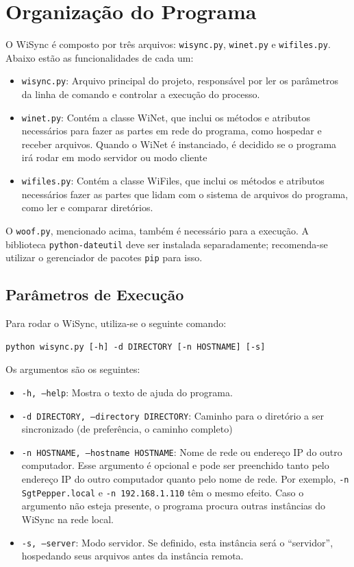 \documentclass[12pt,a4paper]{ufpr}
\begin{document}
\section{Organização do Programa}
O WiSync é composto por três arquivos: \texttt{wisync.py}, \texttt{winet.py} e \texttt{wifiles.py}. Abaixo estão as funcionalidades de cada um:
\begin{itemize}
  \item \texttt{wisync.py}: Arquivo principal do projeto, responsável por ler os parâmetros da linha de comando e controlar a execução do processo.
  \item \texttt{winet.py}: Contém a classe WiNet, que inclui os métodos e atributos necessários para fazer as partes em rede do programa, como hospedar e receber arquivos.
  Quando o WiNet é instanciado, é decidido se o programa irá rodar em modo servidor ou modo cliente
  \item \texttt{wifiles.py}: Contém a classe WiFiles, que inclui os métodos e atributos necessários fazer as partes que lidam com o sistema de arquivos do programa, como ler e comparar diretórios.
\end{itemize}
O \texttt{woof.py}, mencionado acima, também é necessário para a execução.
A biblioteca \texttt{python-dateutil} \cite{python-dateutil} deve ser instalada separadamente; recomenda-se utilizar o gerenciador de pacotes \texttt{pip} \cite{pip} para isso.

\subsection{Parâmetros de Execução}

Para rodar o WiSync, utiliza-se o seguinte comando:
\begin{verbatim}
python wisync.py [-h] -d DIRECTORY [-n HOSTNAME] [-s]
\end{verbatim}

Os argumentos são os seguintes:
\begin{itemize}
  \item \texttt{-h, --help}: Mostra o texto de ajuda do programa.
  \item \texttt{-d DIRECTORY, --directory DIRECTORY}: Caminho para o diretório a ser sincronizado (de preferência, o caminho completo)
  \item \texttt{-n HOSTNAME, --hostname HOSTNAME}: Nome de rede ou endereço IP do outro computador. Esse argumento é opcional e pode ser preenchido tanto pelo endereço IP do outro computador quanto pelo nome de rede. Por exemplo, \texttt{-n SgtPepper.local} e \texttt{-n 192.168.1.110} têm o mesmo efeito. Caso o argumento não esteja presente, o programa procura outras instâncias do WiSync na rede local.
  \item \texttt{-s, --server}: Modo servidor. Se definido, esta instância será o ``servidor'', hospedando seus arquivos antes da instância remota.
\end{itemize}
\end{document}
